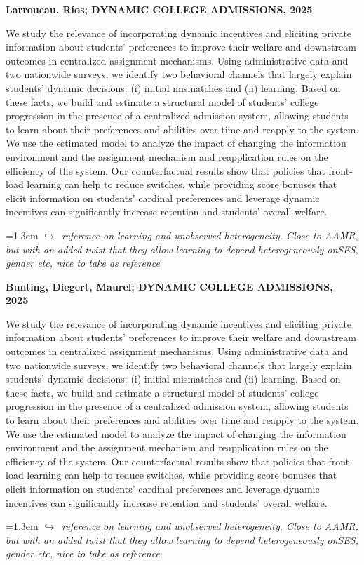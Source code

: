 \documentclass[11pt]{article}
\newcommand{\entry}[3]{%
  \par\medskip\noindent\textbf{#1}\par
  \nopagebreak #2\hspace{0.35em}{\small\color{tagcol}[#3]}\par}
\newcommand{\note}[1]{\par\smallskip\noindent\hangindent=1.3em
  \textcolor{notecol}{\footnotesize$\hookrightarrow$~\textit{#1}}}
\begin{document}
\entry{Larroucau, Ríos; DYNAMIC COLLEGE ADMISSIONS, 2025}
{We study the relevance of incorporating dynamic incentives and eliciting private information about students’ preferences to improve their welfare and downstream outcomes in centralized assignment mechanisms. Using administrative data and two nationwide surveys, we identify two behavioral channels that largely explain students’ dynamic decisions: (i) initial mismatches and (ii) learning. Based on these facts, we build and estimate a structural model of students’ college progression in the presence of a centralized admission system, allowing students to learn about their preferences and abilities over time and reapply to the system. We use the estimated model to analyze the impact of changing the information environment and the assignment mechanism and reapplication rules on the efficiency of the system. Our counterfactual results show that policies that front-load learning can help to reduce switches, while providing score bonuses that elicit information on students’ cardinal preferences and leverage dynamic incentives can significantly increase retention and students’ overall welfare.}{STR}
\note{reference on learning and unobserved heterogeneity. Close to AAMR, but with an added twist that they allow learning to depend heterogeneously onSES, gender etc, nice to take as reference}



\entry{Bunting, Diegert, Maurel; DYNAMIC COLLEGE ADMISSIONS, 2025}
{We study the relevance of incorporating dynamic incentives and eliciting private information about students’ preferences to improve their welfare and downstream outcomes in centralized assignment mechanisms. Using administrative data and two nationwide surveys, we identify two behavioral channels that largely explain students’ dynamic decisions: (i) initial mismatches and (ii) learning. Based on these facts, we build and estimate a structural model of students’ college progression in the presence of a centralized admission system, allowing students to learn about their preferences and abilities over time and reapply to the system. We use the estimated model to analyze the impact of changing the information environment and the assignment mechanism and reapplication rules on the efficiency of the system. Our counterfactual results show that policies that front-load learning can help to reduce switches, while providing score bonuses that elicit information on students’ cardinal preferences and leverage dynamic incentives can significantly increase retention and students’ overall welfare.}{STR}
\note{reference on learning and unobserved heterogeneity. Close to AAMR, but with an added twist that they allow learning to depend heterogeneously onSES, gender etc, nice to take as reference}
\end{document}
